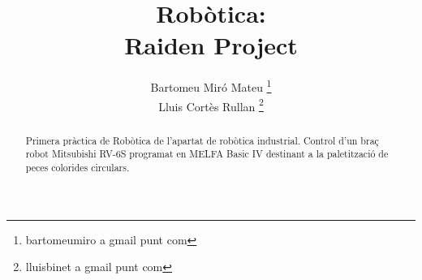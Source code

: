 \documentclass[a4paper,11pt]{scrartcl}
\title{Robòtica: \\ Raiden Project}
\author{ Bartomeu Miró Mateu \thanks{bartomeumiro a gmail punt com} \\
	 Lluis Cortès Rullan \thanks{lluisbinet a gmail punt com} }
\begin{document}
  \maketitle

  \begin{abstract}
    Primera pràctica de Robòtica de l'apartat de robòtica industrial.
    Control d'un braç robot Mitsubishi RV-6S programat en MELFA Basic IV
    destinant a la paletització de peces colorides circulars.
  \end{abstract}

  \newpage
  \setcounter{page}{2}
  \tableofcontents
  \newpage

  
  
  
  
  
  
  
\end{document}
